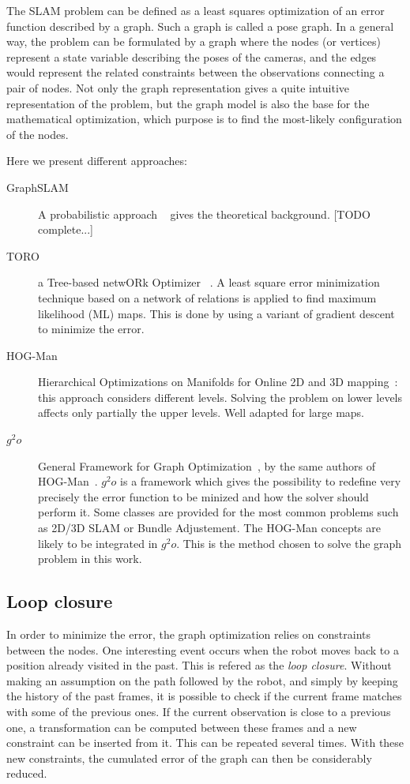 The SLAM problem can be defined as a least squares optimization of an error function described by a graph. Such a graph is called a pose graph. In a general way, the problem can be formulated by a graph where the nodes (or vertices) represent a state variable describing the poses of the cameras, and the edges would represent the related constraints between the observations connecting a pair of nodes. Not only the graph representation gives a quite intuitive representation of the problem, but the graph model is also the base for the mathematical optimization, which purpose is to find the most-likely configuration of the nodes.

Here we present different approaches:

\begin{description}
\item[GraphSLAM] A probabilistic approach ~\cite{Thrun_2005} gives the theoretical background. [TODO complete...]
\item[TORO] a Tree-based netwORk Optimizer ~\cite{grisetti07rss}. A least square error minimization technique based on a network of relations is applied to find maximum likelihood (ML) maps. This is done by using a variant of gradient descent to minimize the error.
\item[HOG-Man] Hierarchical Optimizations on Manifolds for Online 2D and 3D mapping~\cite{hogman_2010}: this approach considers different levels. Solving the problem on lower levels affects only partially the upper levels. Well adapted for large maps.
\item[$g^2o$] General Framework for Graph Optimization~\cite{g2o_2011}, by the same authors of HOG-Man~\cite{hogman_2010}. $g^2o$ is a framework which gives the possibility to redefine very precisely the error function to be minized and how the solver should perform it. Some classes are provided for the most common problems such as 2D/3D SLAM or Bundle Adjustement. The HOG-Man concepts are likely to be integrated in $g^2o$. This is the method chosen to solve the graph problem in this work.
\end{description}

\subsection{Loop closure}

In order to minimize the error, the graph optimization relies on constraints between the nodes. One interesting event occurs when the robot moves back to a position already visited in the past. This is refered as the \emph{loop closure}. Without making an assumption on the path followed by the robot, and simply by keeping the history of the past frames, it is possible to check if the current frame matches with some of the previous ones. If the current observation is close to a previous one, a transformation can be computed between these frames and a new constraint can be inserted from it. This can be repeated several times. With these new constraints, the cumulated error of the graph can then be considerably reduced. 

